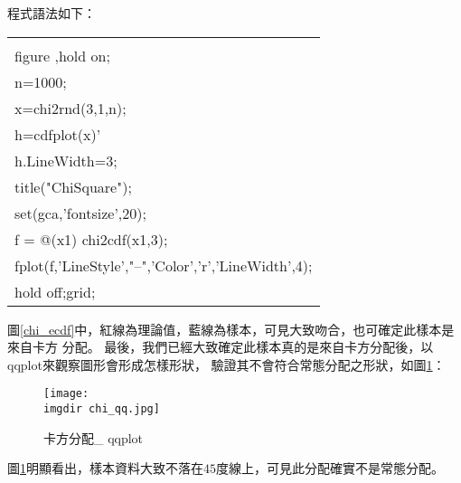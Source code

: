 \begin{enumerate}
{			程式語法如下：
			\begin{center}\colorbox{slight}{
				\begin{tabular}{p{}}
					\MJHmarker{\textbf{\color{darkblue}{MATLAB語法 :}}}\\		
					figure ,hold on;\\
					n=1000;\\
					x=chi2rnd(3,1,n);\\
					h=cdfplot(x)'\\
					h.LineWidth=3;\\					
					title("ChiSquare");   \\
					set(gca,'fontsize',20);\\
					f = @(x1) chi2cdf(x1,3);\\
					fplot(f,'LineStyle',"--",'Color','r','LineWidth',4);\\
					hold off;grid;\\
				\end{tabular}
			}
			\end{center}
			圖\ref{chi_ecdf}中，紅線為理論值，藍線為樣本，可見大致吻合，也可確定此樣本是來自卡方				分配。			
			最後，我們已經大致確定此樣本真的是來自卡方分配後，以qqplot來觀察圖形會形成怎樣形狀，				驗證其不會符合常態分配之形狀，如圖\ref{chi_qq}：
			\begin{figure}[H]	
		 		 \centering	 			 	 
   				 \texttt{[image: \\imgdir chi\_qq.jpg]} 
   			 	 \caption{卡方分配\_ qqplot}   		
   			 	 \label{chi_qq}   			 		 
			\end{figure}
			圖\ref{chi_qq}明顯看出，樣本資料大致不落在$45$度線上，可見此分配確實不是常態分配。
		}
		\end{enumerate}	
